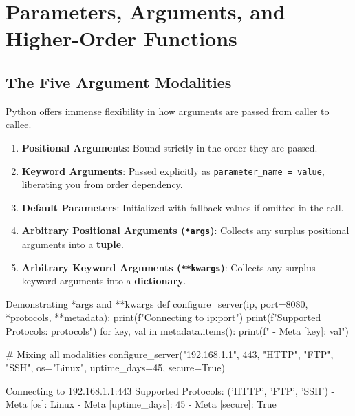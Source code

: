 \section{Parameters, Arguments, and Higher-Order Functions}

\subsection{The Five Argument Modalities}
Python offers immense flexibility in how arguments are passed from caller to callee.
\begin{enumerate}[leftmargin=1.5em]
    \item \textbf{Positional Arguments}: Bound strictly in the order they are passed.
    \item \textbf{Keyword Arguments}: Passed explicitly as \texttt{parameter\_name = value}, liberating you from order dependency.
    \item \textbf{Default Parameters}: Initialized with fallback values if omitted in the call.
    \item \textbf{Arbitrary Positional Arguments (\texttt{*args})}: Collects any surplus positional arguments into a \textbf{tuple}.
    \item \textbf{Arbitrary Keyword Arguments (\texttt{**kwargs})}: Collects any surplus keyword arguments into a \textbf{dictionary}.
\end{enumerate}

\begin{pythoncode}{Demonstrating *args and **kwargs}
def configure_server(ip, port=8080, *protocols, **metadata):
    print(f"Connecting to {ip}:{port}")
    print(f"Supported Protocols: {protocols}")
    for key, val in metadata.items():
        print(f" - Meta [{key}]: {val}")

# Mixing all modalities
configure_server("192.168.1.1", 443, "HTTP", "FTP", "SSH", 
                 os="Linux", uptime_days=45, secure=True)
\end{pythoncode}

\begin{outputbox}
Connecting to 192.168.1.1:443
Supported Protocols: ('HTTP', 'FTP', 'SSH')
 - Meta [os]: Linux
 - Meta [uptime_days]: 45
 - Meta [secure]: True
\end{outputbox}

